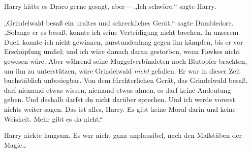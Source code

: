 Harry hätte es Draco gerne gesagt, aber— „Ich schwöre,“ sagte Harry.

„Grindelwald besaß ein uraltes und schreckliches Gerät,“ sagte Dumbledore. „Solange er es besaß, konnte ich seine Verteidigung nicht brechen. In unserem Duell konnte ich nicht gewinnen, nurstundenlang gegen ihn kämpfen, bis er vor Erschöpfung umfiel; und ich wäre danach daran gestorben, wenn Fawkes nicht gewesen wäre. Aber während seine Muggelverbündeten noch Blutopfer brachten, um ihn zu unterstützen, wäre Grindelwald \emph{nicht} gefallen. Er war in dieser Zeit buchstäblich unbesiegbar. Von dem fürchterlichen Gerät, das Grindelwald besaß, darf niemand etwas wissen, niemand etwas ahnen, es darf keine Andeutung geben. Und deshalb darfst du nicht darüber sprechen. Und ich werde vorerst nichts weiter sagen. Das ist alles, Harry. Es gibt keine Moral darin und keine Weisheit. Mehr gibt es da nicht.“

Harry nickte langsam. Es war nicht ganz unplausibel, nach den Maßstäben der Magie…


